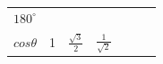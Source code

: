 {\begin{tabular}[t]{|l|l|l|l|l|l|l|}
    
        
                \begin{math}{180}^{\circ }\end{math}
     \tabularnewline\cline{1-1}\cline{2-2}\cline{3-3}\cline{4-4}\cline{5-5}\cline{6-6}\cline{7-7}
    
    
        
                \begin{math}cos\theta \end{math}
               &
    
    
        1 &
    
    
        
                \begin{math}\frac{\sqrt{3}}{2}\end{math}
               &
    
    
        
                \begin{math}\frac{1}{\sqrt{2}}\end{math}
               &
    
    
        

\end{tabular}}
